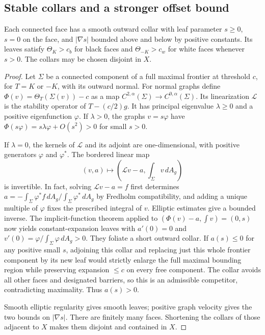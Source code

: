 \subsection{Stable collars and a stronger offset bound}

\begin{lemma}\label{ch:prep:collar}
Each connected face has a smooth outward collar with leaf parameter
$s\geq0$, $s=0$ on the face, and $|\nabla s|$ bounded above and
below by positive constants.  Its leaves satisfy
$\Theta_K>c_b$ for black faces and $\Theta_{-K}>c_w$ for white
faces whenever $s>0$.  The collars may be chosen disjoint in $X$.
\end{lemma}

\begin{proof}
Let $\Sigma$ be a connected component of a full maximal frontier
at threshold $c$, for $T=K$ or $-K$, with its outward normal.
For normal graphs define
$\Phi(v)=\Theta_T(\Sigma(v))-c$ as a map
$C^{2,\alpha}(\Sigma)\to C^{0,\alpha}(\Sigma)$.
Its linearization $\mathcal L$ is the stability operator of
$T-(c/2)g$.  It has principal eigenvalue $\lambda\geq0$ and a
positive eigenfunction $\varphi$.  If $\lambda>0$, the graphs
$v=s\varphi$ have
$\Phi(s\varphi)=s\lambda\varphi+O(s^2)>0$ for small $s>0$.

If $\lambda=0$, the kernels of $\mathcal L$ and its adjoint are
one-dimensional, with positive generators $\varphi$ and
$\varphi^*$.  The bordered linear map
\begin{equation}\label{ch:prep:fredholm}
 (v,a)\longmapsto
 \left(\mathcal L v-a,\int_\Sigma v\,dA_g\right)
\end{equation}
is invertible.  In fact, solving $\mathcal L v-a=f$ first determines
$a=-\int_\Sigma\varphi^*f\,dA_g/\int_\Sigma\varphi^*\,dA_g$
by Fredholm compatibility, and adding a unique multiple of
$\varphi$ fixes the prescribed integral of $v$.  Elliptic estimates
give a bounded inverse.  The implicit-function theorem applied to
$(\Phi(v)-a,\int v)=(0,s)$ now yields constant-expansion leaves
with $a'(0)=0$ and $v'(0)=\varphi/\int_\Sigma\varphi\,dA_g>0$.
They foliate a short outward collar.  If $a(s)\leq0$ for any
positive small $s$, adjoining this collar and replacing just this
whole frontier component by its new leaf would strictly enlarge
the full maximal bounding region while preserving expansion
$\leq c$ on every free component.  The collar avoids all other
faces and designated barriers, so this is an admissible competitor,
contradicting maximality.  Thus $a(s)>0$.

Smooth elliptic regularity gives smooth leaves; positive graph
velocity gives the two bounds on $|\nabla s|$.  There are finitely
many faces.  Shortening the collars of those adjacent to $X$ makes
them disjoint and contained in $X$.
\end{proof}

